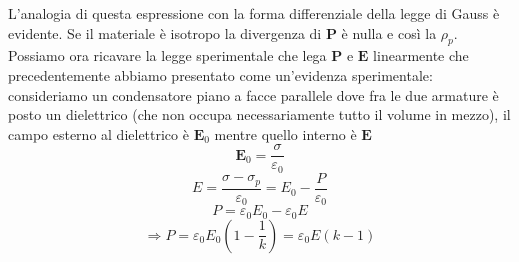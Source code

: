 \documentclass[
10pt, %
a4paper, %
oneside, %
headinclude,footinclude, %
BCOR5mm, %
]{scrartcl}
\begin{document}
L'analogia di questa espressione con la forma differenziale della legge di Gauss è evidente. Se il materiale è isotropo la divergenza di $\mathbf{P}$ è nulla e così la \(\rho_p\).\\
Possiamo ora ricavare la legge sperimentale che lega $\mathbf{P}$ e $\mathbf{E}$ linearmente che precedentemente abbiamo presentato come un'evidenza sperimentale: consideriamo un condensatore piano a facce parallele dove fra le due armature è posto un dielettrico (che non occupa necessariamente tutto il volume in mezzo), il campo esterno al dielettrico è $\mathbf{E}_0$ mentre quello interno è $\mathbf{E}$
\[\mathbf{E}_0 = \frac{\sigma}{\varepsilon_0}\]
\[E = \frac{\sigma - \sigma_p}{\varepsilon_0} = E_0 -\frac{P}{\varepsilon_0}\]
\[P = \varepsilon_0 E_0- \varepsilon_0 E\]
\[\Rightarrow P = \varepsilon_0 E_0 (1-\frac{1}{k}) = \varepsilon_0 E(k-1) \]
\end{document}
